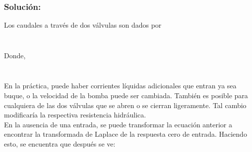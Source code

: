\documentclass[a4paper,12pt,twoside]{proyectotanquesecci}
\begin{document}
\subsubsection{Solución:}



Los caudales a través de dos válvulas son dados por

\begin{equation}
\end{equation}


\begin{equation}
\end{equation}

Donde,

\begin{equation}
\end{equation}


\begin{equation}
\end{equation}

En la práctica, puede haber corrientes líquidas adicionales que entran ya sea buque, o la velocidad de la bomba puede ser cambiada. También es posible para cualquiera de las dos válvulas que se abren o se cierran ligeramente. Tal cambio modificaría la respectiva resistencia hidráulica. \\
En la ausencia de una entrada, se puede transformar la ecuación anterior a encontrar la transformada de Laplace de la respuesta cero de entrada. Haciendo esto, se encuentra que después se ve:
\end{document}
